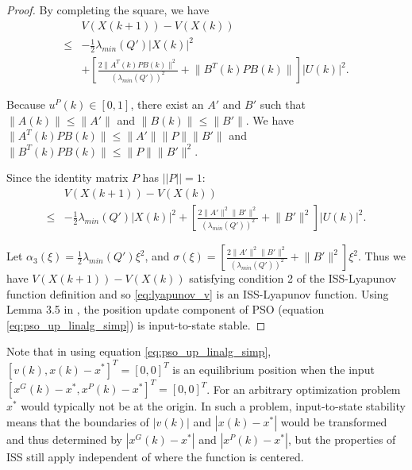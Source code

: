 \begin{mythm}
\begin{proof}
By completing the square, we have
\begin{equation}
\label{eq:lyapunov_delta4}
\begin{aligned}
& V( X(k+1) ) - V( X(k) ) \\
\leq & - \frac{1}{2} \lambda_{min}(Q') | X(k) |^{2} \\
& + \left[ \frac{2 \lVert A^{T}(k) P B(k) \rVert^{2}}{ ( \lambda_{min}(Q') )^{2} } + \lVert B^{T}(k) P B(k) \rVert \right] | U(k) |^{2}. 
\end{aligned}
\end{equation}

Because $ u^{P}(k) \in [0, 1] $, there exist an $ A' $ and $ B' $ such that $ \lVert A(k) \rVert \leq \lVert A' \rVert $ and $ \lVert B(k) \rVert \leq \lVert B' \rVert $.
We have $ \lVert A^{T}(k) P B(k) \rVert \leq \lVert A' \rVert \lVert P \rVert \lVert B' \rVert $ and $ \lVert B^{T}(k) P B(k) \rVert \leq \lVert P \rVert \lVert B' \rVert^{2} $.

Since the identity matrix $ P $ has $ || P || = 1 $:
\begin{equation}
\label{eq:lyapunov_delta5}
\begin{aligned}
& V( X(k+1) ) - V( X(k) ) \\
\leq & - \frac{1}{2} \lambda_{min}(Q') | X(k) |^{2} + [ \frac{2 \lVert A' \rVert^{2} \lVert B' \rVert^{2}}{ ( \lambda_{min}(Q') )^{2} } + \lVert B' \rVert^{2} ] | U(k) |^{2}.
\end{aligned}
\end{equation}

Let
$ \alpha_{3} ( \xi )= \frac{1}{2} \lambda_{min}(Q') \xi^{2} $,
and
$ \sigma ( \xi ) = [ \frac{2 \lVert A' \rVert^{2} \lVert B' \rVert^{2}}{ ( \lambda_{min}(Q') )^{2} } +  \lVert B' \rVert^{2} ] \xi^{2} $.
Thus we have $  V( X(k+1) ) - V( X(k) ) $ satisfying condition 2 of the ISS-Lyapunov function definition and
so \eqref{eq:lyapunov_v} is an ISS-Lyapunov function.
Using Lemma 3.5 in \cite{Jiang2001857}, the position update component of PSO (equation \eqref{eq:pso_up_linalg_simp}) is input-to-state stable.

\end{proof}
\end{mythm}

Note that in using equation \eqref{eq:pso_up_linalg_simp},
$ [ v(k), x(k) - x^{*} ]^{T} = [0, 0]^{T} $ is an equilibrium position when the input $ [ x^{G}(k) - x^{*} , x^{P}(k) - x^{*} ]^{T} = [0, 0]^{T} $.
For an arbitrary optimization problem $ x^{*} $ would typically not be at the origin. 
In such a problem, input-to-state stability means that the boundaries of $ | v(k) | $ and $ | x(k) - x^{*} | $ would be transformed and thus determined by $ | x^{G}(k) - x^{*} | $ and $ | x^{P}(k) - x^{*} | $,
but the properties of ISS still apply independent of where the function is centered.

